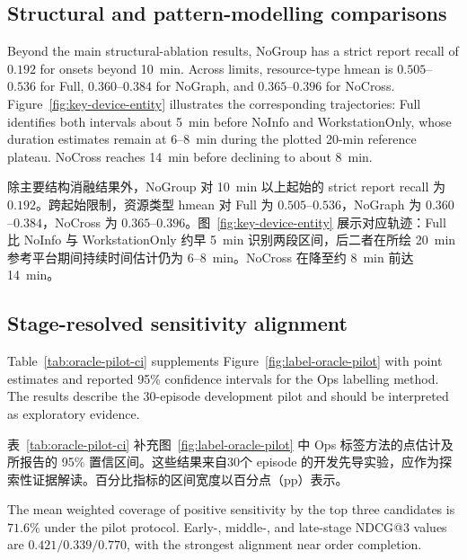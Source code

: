\documentclass[a4paper,fleqn]{cas-dc}
\newcommand{\zhpara}[1]{%
  \par\begingroup\small\color{black!72}\noindent #1\par\endgroup}
\begin{document}
\subsection{Structural and pattern-modelling comparisons}

Beyond the main structural-ablation results, NoGroup has a strict report recall of $0.192$ for onsets beyond 10~min. Across limits, resource-type hmean is $0.505$--$0.536$ for Full, $0.360$--$0.384$ for NoGraph, and $0.365$--$0.396$ for NoCross. Figure~\ref{fig:key-device-entity} illustrates the corresponding trajectories: Full identifies both intervals about 5~min before NoInfo and WorkstationOnly, whose duration estimates remain at 6--8~min during the plotted 20-min reference plateau. NoCross reaches 14~min before declining to about 8~min.

\zhpara{除主要结构消融结果外，NoGroup 对 10~min 以上起始的 strict report recall 为 $0.192$。跨起始限制，资源类型 hmean 对 Full 为 $0.505$--$0.536$，NoGraph 为 $0.360$--$0.384$，NoCross 为 $0.365$--$0.396$。图~\ref{fig:key-device-entity} 展示对应轨迹：Full 比 NoInfo 与 WorkstationOnly 约早 5~min 识别两段区间，后二者在所绘 20~min 参考平台期间持续时间估计仍为 6--8~min。NoCross 在降至约 8~min 前达 14~min。}







\subsection{Stage-resolved sensitivity alignment}

Table~\ref{tab:oracle-pilot-ci} supplements Figure~\ref{fig:label-oracle-pilot} with point estimates and reported 95\% confidence intervals for the Ops labelling method. The results describe the 30-episode development pilot and should be interpreted as exploratory evidence.

\zhpara{表~\ref{tab:oracle-pilot-ci} 补充图~\ref{fig:label-oracle-pilot} 中 Ops 标签方法的点估计及所报告的 95\% 置信区间。这些结果来自30个 episode 的开发先导实验，应作为探索性证据解读。百分比指标的区间宽度以百分点（pp）表示。}



The mean weighted coverage of positive sensitivity by the top three candidates is $71.6\%$ under the pilot protocol. Early-, middle-, and late-stage NDCG@3 values are $0.421/0.339/0.770$, with the strongest alignment near order completion. 
\end{document}

